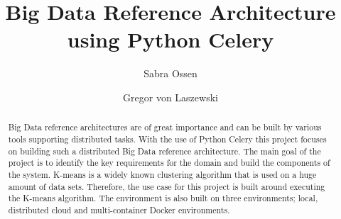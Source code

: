 

\def\paperstatus{100} %
\def\paperchapter{Workflow} %
\def\hid{hid-sp18-416} %
\def\volume{9} %

\def\locator{\hid, Volume: \volume, Chapter: \paperchapter, Status: \paperstatus. \newline}


\title{Big Data Reference Architecture using Python Celery}


\author{Sabra Ossen}

\author{Gregor von Laszewski}


\renewcommand{\shortauthors}{G. v. Laszewski}


\begin{abstract}
Big Data reference architectures are of great importance and can be built by 
various tools supporting distributed tasks. With the use of Python Celery this 
project focuses on building such a distributed Big Data reference 
architecture. The main goal of the project is to identify the key requirements 
for the domain and build the components of the system. K-means is a widely 
known clustering algorithm that is used on a huge amount of data sets. 
Therefore, the use case for this project is built around executing the K-means 
algorithm. The environment is also built on three environments; local, 
distributed cloud and multi-container Docker environments.
\end{abstract}

